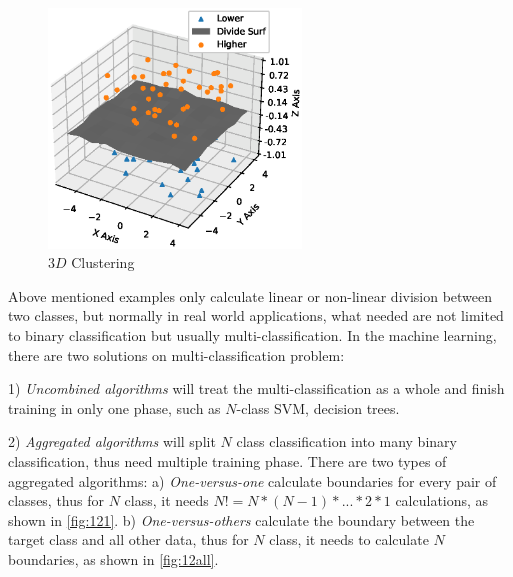 \begin{spacing}{1.5}
\begin{figure}[ht]
\centering
\includegraphics[width=0.6\textwidth, fbox]{Chapter2/3dcluster.eps}
\caption{$3D$ Clustering}
\label{fig:3dcluster} 
\end{figure}

Above mentioned examples only calculate linear or non-linear division between two classes, but normally in real world applications, what needed are not limited to binary classification but usually multi-classification. In the machine learning, there are two solutions on multi-classification problem: 

1) \textit{Uncombined algorithms} will treat the multi-classification as a whole and finish training in only one phase, such as $N$-class SVM, decision trees. 

2) \textit{Aggregated algorithms} will split $N$ class classification into many binary classification, thus need multiple training phase. There are two types of aggregated algorithms: a) \textit{One-versus-one} calculate boundaries for every pair of classes, thus for $N$ class, it needs $N!=N*(N-1)*...*2*1$ calculations, as shown in \autoref{fig:121}. b) \textit{One-versus-others} calculate the boundary between the target class and all other data, thus for $N$ class, it needs to calculate $N$ boundaries, as shown in \autoref{fig:12all}. 


\end{spacing}
